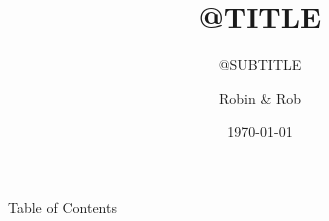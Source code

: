 \documentclass[10pt]{beamer}
\title{@TITLE}
\subtitle{@SUBTITLE}
\author[R. Aggleton]{Robin \& Rob}
\date{\today}
\begin{document}
\begin{frame}[plain]
  \titlepage
\end{frame}

\begin{frame}{Table of Contents}
    \begin{multicols}{2}
        \tableofcontents
    \end{multicols}
\end{frame}


\end{document}
